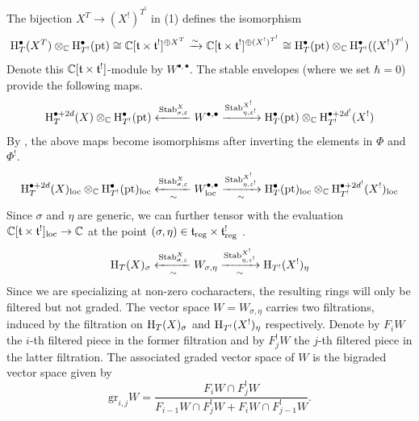 The bijection $X^T \to (X^!)^{T^!}$ in  (1) defines the isomorphism
\begin{equation*}
    \mathrm{H}^\bullet_T(X^T) \otimes_\mathbb{C} \mathrm{H}^\bullet_{T^!}(\mathrm{pt}) \cong \mathbb{C}[\mathfrak{t} \times \mathfrak{t}^!]^{\oplus X^T} \xrightarrow{\sim} \mathbb{C}[\mathfrak{t} \times \mathfrak{t}^!]^{\oplus (X^!)^{T^!}} \cong \mathrm{H}^\bullet_T(\mathrm{pt}) \otimes_\mathbb{C} \mathrm{H}^\bullet_{T^!}((X^!)^{T^!})
\end{equation*}
Denote this $\mathbb{C}[\mathfrak{t} \times \mathfrak{t}^!]$-module by $W^{\bullet, \bullet}$. The stable envelopes (where we set $\hbar = 0$) provide the following maps.
\begin{equation*}
    \mathrm{H}^{\bullet+2d}_T(X) \otimes_\mathbb{C} \mathrm{H}^\bullet_{T^!}(\mathrm{pt}) \xleftarrow{\mathrm{Stab}_{\sigma, \varepsilon}^X} W^{\bullet, \bullet} \xrightarrow{\mathrm{Stab}_{\eta, \varepsilon^!}^{X^!}} \mathrm{H}^\bullet_T(\mathrm{pt}) \otimes_\mathbb{C} \mathrm{H}^{\bullet+2d^!}_{T^!}(X^!)
\end{equation*}
By , the above maps become isomorphisms after inverting the elements in $\Phi$ and $\Phi^!$.
\begin{equation} \label{eqn:M}
    \mathrm{H}^{\bullet+2d}_T(X)_{\mathrm{loc}} \otimes_\mathbb{C} \mathrm{H}^\bullet_{T^!}(\mathrm{pt})_{\mathrm{loc}} \xleftarrow[\sim]{\mathrm{Stab}_{\sigma, \varepsilon}^X} W^{\bullet, \bullet}_{\mathrm{loc}} \xrightarrow[\sim]{\mathrm{Stab}_{\eta, \varepsilon^!}^{X^!}} \mathrm{H}^\bullet_T(\mathrm{pt})_{\mathrm{loc}} \otimes_\mathbb{C} \mathrm{H}^{\bullet+2d^!}_{T^!}(X^!)_{\mathrm{loc}}
\end{equation}
Since $\sigma$ and $\eta$ are generic, we can further tensor with the evaluation $\mathbb{C}[\mathfrak{t} \times \mathfrak{t}^!]_{\mathrm{loc}} \to \mathbb{C}$ at the point $(\sigma, \eta) \in \mathfrak{t}_\mathrm{reg} \times \mathfrak{t}^!_\mathrm{reg}$ .
\begin{equation} \label{eqn:m}
    \mathrm{H}_T(X)_\sigma \xleftarrow[\sim]{\mathrm{Stab}_{\sigma, \varepsilon}^X} W_{\sigma, \eta} \xrightarrow[\sim]{\mathrm{Stab}_{\eta, \varepsilon^!}^{X^!}} \mathrm{H}_{T^!}(X^!)_\eta
\end{equation}
Since we are specializing at non-zero cocharacters, the resulting rings will only be filtered but not graded. The vector space $W = W_{\sigma, \eta}$ carries two filtrations, induced by the filtration on $\mathrm{H}_T(X)_\sigma$ and $\mathrm{H}_{T^!}(X^!)_\eta$ respectively. Denote by $F_iW$ the $i$-th filtered piece in the former filtration and by $F^!_jW$ the $j$-th filtered piece in the latter filtration. The associated graded vector space of $W$ is the bigraded vector space given by
\begin{equation*}
    \mathrm{gr}_{i, j} W = \frac{F_iW \cap F^!_jW}{F_{i-1}W \cap F^!_jW + F_iW \cap F^!_{j-1}W}.
\end{equation*}

